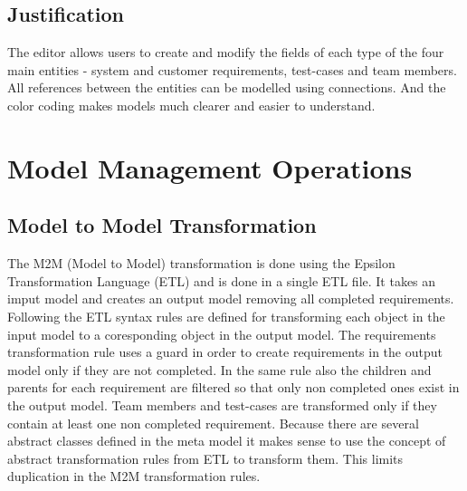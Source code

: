 \documentclass[11pt,a4paper]{article}
\begin{document}
	
	\subsection{Justification}
	The editor allows users to create and modify the fields of each type of the four main entities - system and customer requirements, test-cases and team members. All references between the entities can be modelled using connections. And the color coding makes models much clearer and easier to understand.



	\section{Model Management Operations}
	
	\subsection{Model to Model Transformation}
	The M2M (Model to Model) transformation is done using the Epsilon Transformation Language (ETL) \cite{etl} and is done in a single ETL file. It takes an imput model and creates an output model removing all completed requirements. Following the ETL syntax rules are defined for transforming each object in the input model to a coresponding object in the output model. The requirements transformation rule uses a guard in order to create requirements in the output model only if they are not completed. In the same rule also the children and parents for each requirement are filtered so that only non completed ones exist in the output model. Team members and test-cases are transformed only if they contain at least one non completed requirement. Because there are several abstract classes defined in the meta model it makes sense to use the concept of abstract transformation rules from ETL to transform them. This limits duplication in the M2M transformation rules.
	
\end{document}
